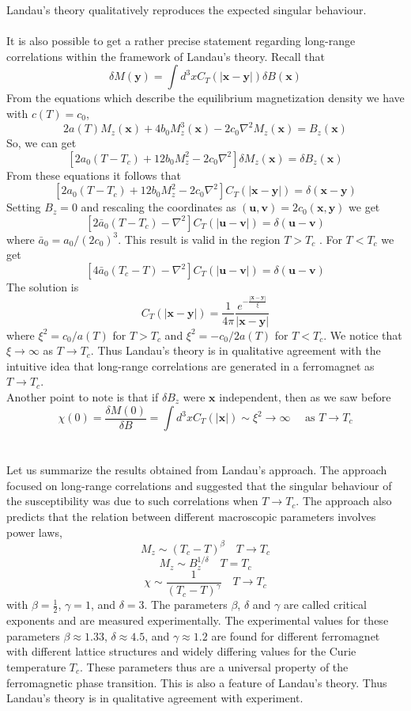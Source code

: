 Landau's theory qualitatively reproduces the expected singular behaviour.
\\ \\
It is also possible to get a rather precise statement regarding long-range correlations within the framework of Landau's theory. Recall that
\[\delta M(\bm{y}) = \int d^3x C_T(|\bm{x}-\bm{y}|)\delta B(\bm{x})\]
From the equations which describe the equilibrium magnetization density we have with $c(T) = c_0$,
\[2a(T)M_z(\bm{x}) + 4b_0M_z^3(\bm{x})- 2c_0\nabla^2M_z(\bm{x}) = B_z(\bm{x})\]
So, we can get
\[[2a_0(T-T_c) + 12b_0M_z^2 - 2c_0\nabla^2] \delta M_z(\bm{x}) = \delta B_z(\bm{x})\]
From these equations it follows that
\[[2a_0(T-T_c) + 12b_0M_z^2 - 2c_0\nabla^2]C_T(|\bm{x} - \bm{y}|) = \delta(\bm{x} - \bm{y}) \]
Setting $B_z = 0$ and rescaling the coordinates as $(\bm{u},\bm{v}) = 2c_0(\bm{x},\bm{y})$ we get
\[[2\bar{a}_0(T-T_c) - \nabla^2] C_T(|\bm{u} - \bm{v}|) = \delta(\bm{u} - \bm{v})\]
where $\bar{a}_0 = a_0/(2c_0)^3$.
This result is valid in the region $T > T_c$ . For $T < T_c$ we get
\[[4\bar{a}_0(T_c-T) - \nabla^2] C_T(|\bm{u} - \bm{v}|) = \delta(\bm{u} - \bm{v})\]
The solution is
\[C_T(|\bm{x} - \bm{y}|) = \frac{1}{4\pi} \frac{e^{-\frac{|\bm{x} - \bm{y}|}{\xi}}}{|\bm{x} - \bm{y}|}\]
where $\xi^2 = c_0/a(T)$ for $T > T_c$ and $\xi^2 = -c_0/2a(T)$ for $T < T_c$.
We notice that $\xi \to \infty$ as $T \to T_c$. Thus Landau's theory is in qualitative agreement with the intuitive idea that long-range correlations are generated in a ferromagnet as $T \to T_c$.
\\
Another point to note is that if $\delta B_z$ were $\bm{x}$ independent, then as we saw before
\[\chi(0) = \frac{\delta M(0)}{\delta B} = \int d^3x C_T(|\bm{x}|) \sim \xi^2 \to \infty \quad \mbox{ as } T \to T_c\]
\\ \\
Let us summarize the results obtained from Landau's approach. The approach focused on long-range correlations and suggested that the singular behaviour of the susceptibility was due to such correlations when $T \to T_c$. 
The approach also predicts that the relation between different macroscopic parameters involves power laws,
\[M_z \sim (T_c - T)^{\beta} \quad T \to T_c\]
\[M_z \sim B_z^{1/\delta} \quad T = T_c\]
\[\chi \sim \frac{1}{(T_c-T)^{\gamma}} \quad T \to T_c\]
with $\beta = \frac{1}{2}$, $\gamma = 1$, and $\delta = 3$. The parameters $\beta$, $\delta$ and $\gamma$ are called critical exponents and are measured experimentally. 
The experimental values for these parameters
$\beta \approx 1.33$, $\delta \approx 4.5$, and $\gamma \approx 1.2$ are found for different ferromagnet with different lattice structures and widely differing values for the Curie temperature $T_c$. 
These parameters thus are a universal property of the ferromagnetic phase transition. This is also a feature of Landau's theory. Thus Landau's theory is in qualitative
agreement with experiment.

